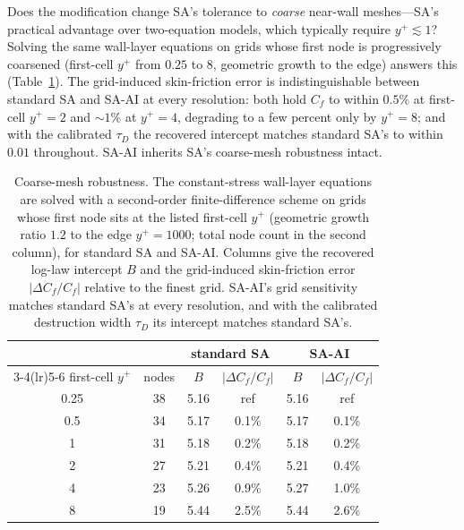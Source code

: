\documentclass[journal]{new-aiaa}
\begin{document}
Does the modification change SA's tolerance to
\emph{coarse} near-wall meshes---SA's practical advantage over two-equation models,
which typically require $y^+\!\lesssim\!1$? Solving the same wall-layer equations on
grids whose first node is progressively coarsened (first-cell $y^+$ from $0.25$ to
$8$, geometric growth to the edge) answers this (Table~\ref{tab:yplus}).
The grid-induced skin-friction error is indistinguishable between standard SA and
SA-AI at every resolution: both hold $C_f$ to within $0.5\%$ at first-cell
$y^+\!=\!2$ and $\sim\!1\%$ at $y^+\!=\!4$, degrading to a few percent only by
$y^+\!=\!8$; and with the calibrated $\tau_D$ the recovered intercept matches
standard SA's to within $0.01$ throughout. SA-AI
inherits SA's coarse-mesh robustness intact.

\begin{table}[tp]
  \centering
  \small
  \caption{Coarse-mesh robustness. The constant-stress wall-layer equations are
  solved with a second-order finite-difference scheme on grids whose first node
  sits at the listed first-cell $y^+$ (geometric growth ratio $1.2$ to the edge
  $y^+\!=\!1000$; total node count in the second column), for standard SA and
  SA-AI. Columns give the recovered log-law intercept $B$ and the grid-induced
  skin-friction error $|\Delta C_f/C_f|$ relative to the finest grid. SA-AI's grid
  sensitivity matches standard SA's at every resolution, and with the calibrated
  destruction width $\tau_D$ its intercept matches standard SA's.}
  \label{tab:yplus}
  \begin{tabular}{cc cc cc}
    \toprule
    & & \multicolumn{2}{c}{standard SA} & \multicolumn{2}{c}{SA-AI}\\
    \cmidrule(lr){3-4}\cmidrule(lr){5-6}
    first-cell $y^+$ & nodes & $B$ & $|\Delta C_f/C_f|$ & $B$ & $|\Delta C_f/C_f|$\\
    \midrule
    0.25 & 38 & 5.16 & ref    & 5.16 & ref \\
    0.5  & 34 & 5.17 & 0.1\%  & 5.17 & 0.1\% \\
    1    & 31 & 5.18 & 0.2\%  & 5.18 & 0.2\% \\
    2    & 27 & 5.21 & 0.4\%  & 5.21 & 0.4\% \\
    4    & 23 & 5.26 & 0.9\%  & 5.27 & 1.0\% \\
    8    & 19 & 5.44 & 2.5\%  & 5.44 & 2.6\% \\
    \bottomrule
  \end{tabular}
\end{table}
\end{document}
